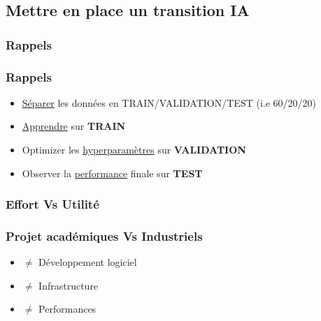 \subsection{Mettre en place un transition IA}

\begin{frame}
  \frametitle{Rappels}
\end{frame}

\begin{frame}
  \frametitle{Rappels}
  \begin{itemize}
  \item \underline{Séparer} les données en TRAIN/VALIDATION/TEST (i.e 60/20/20)
  \item \underline{Apprendre} sur \textbf{TRAIN}
  \item Optimizer les \underline{hyperparamètres} sur \textbf{VALIDATION}
  \item Observer la \underline{performance} finale sur \textbf{TEST}
  \end{itemize}
\end{frame}

\begin{frame}
  \frametitle{Effort Vs Utilité}
\end{frame}

\begin{frame}
  \frametitle{Projet académiques Vs Industriels}
  \begin{itemize}
  \item $\neq$ Développement logiciel
  \item $\neq$ Infrastructure
  \item $\neq$ Performances
  \end{itemize}
\end{frame}


